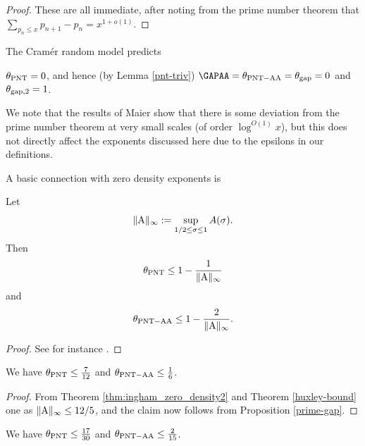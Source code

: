 \begin{proof} These are all immediate, after noting from the prime number theorem that $\sum_{p_n \leq x} p_{n+1} - p_n = x^{1+o(1)}$.
\end{proof}

The Cram\'er random model \cite{cramer} predicts

\begin{conjecture} $\theta_{\mathrm{PNT}} = 0$, and hence (by Lemma \ref{pnt-triv}) $\GAPAA = \PNTAA = \GAPMAX=0$ and $\theta_{\mathrm{gap},2}=1$.
\end{conjecture}

We note that the results of Maier \cite{maier-primes} show that there is some deviation from the prime number theorem at very small scales (of order $\log^{O(1)} x$), but this does not directly affect the exponents discussed here due to the epsilons in our definitions.

A basic connection with zero density exponents is

\begin{proposition}\label{prime-gap}  Let
\begin{equation}\label{A-def}
    \|\mathrm{A}\|_\infty := \sup_{1/2 \leq \sigma \leq 1} A(\sigma).
\end{equation}
Then
    $$ \theta_{\mathrm{PNT}} \leq 1 - \frac{1}{\|\mathrm{A}\|_\infty}$$
    and
    $$ \theta_{\mathrm{PNT-AA}} \leq 1 - \frac{2}{\|\mathrm{A}\|_\infty}.$$
\end{proposition}

\begin{proof} See for instance \cite[\S 13.2]{guth-maynard}.
\end{proof}

\begin{corollary}  We have $\theta_{\mathrm{PNT}} \leq \frac{7}{12}$ and $\theta_{\mathrm{PNT-AA}} \leq \frac{1}{6}$.
\end{corollary}

\begin{proof}  From Theorem \ref{thm:ingham_zero_density2} and Theorem \ref{huxley-bound} one as $\|\mathrm{A}\|_\infty \leq 12/5$, and the claim now follows from Proposition \ref{prime-gap}.
\end{proof}

\begin{corollary}\cite{guth-maynard}  We have $\theta_{\mathrm{PNT}} \leq \frac{17}{30}$ and $\theta_{\mathrm{PNT-AA}} \leq \frac{2}{15}$.
\end{corollary}

